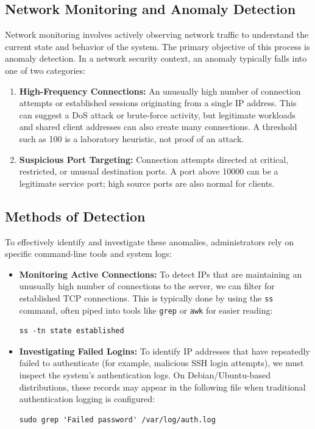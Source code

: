 \documentclass[journal]{IEEEtran}
\begin{document}
\subsection{Network Monitoring and Anomaly Detection}

Network monitoring involves actively observing network traffic to understand the current state and behavior of the system. The primary objective of this process is anomaly detection. In a network security context, an anomaly typically falls into one of two categories:

\begin{enumerate}
    \item \textbf{High-Frequency Connections:} An unusually high number of connection attempts or established sessions originating from a single IP address. This can suggest a DoS attack or brute-force activity, but legitimate workloads and shared client addresses can also create many connections. A threshold such as 100 is a laboratory heuristic, not proof of an attack.
    \item \textbf{Suspicious Port Targeting:} Connection attempts directed at critical, restricted, or unusual destination ports. A port above 10000 can be a legitimate service port; high source ports are also normal for clients.
\end{enumerate}

\subsection{Methods of Detection}

To effectively identify and investigate these anomalies, administrators rely on specific command-line tools and system logs:

\begin{itemize}
    \item \textbf{Monitoring Active Connections:}
    To detect IPs that are maintaining an unusually high number of connections to the server, we can filter for established TCP connections. This is typically done by using the \texttt{ss} command, often piped into tools like \texttt{grep} or \texttt{awk} for easier reading:
    \begin{lstlisting}
ss -tn state established
    \end{lstlisting}

    \item \textbf{Investigating Failed Logins:}
    To identify IP addresses that have repeatedly failed to authenticate (for example, malicious SSH login attempts), we must inspect the system's authentication logs. On Debian/Ubuntu-based distributions, these records may appear in the following file when traditional authentication logging is configured:
    \begin{lstlisting}
sudo grep 'Failed password' /var/log/auth.log
    \end{lstlisting}
\end{itemize}
\end{document}
